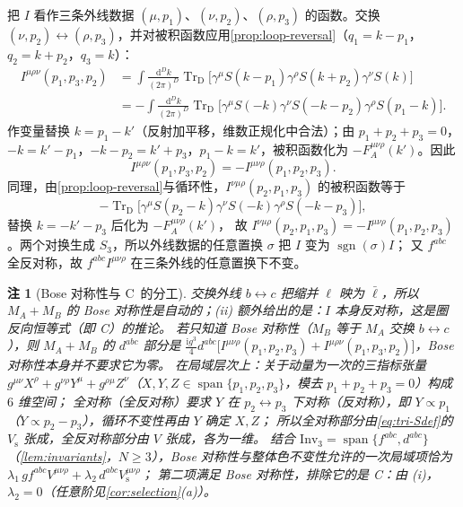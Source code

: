 \documentclass[UTF8,a4paper,11pt,fontset=fandol]{ctexart}
\makeatletter
\theoremstyle{cplain}
\theoremstyle{cdefinition}
\theoremstyle{cremark}
\newtheorem{remark}[theorem]{注}
\renewcommand{\proofname}{证明}
\renewenvironment{proof}[1][\proofname]{\par\pushQED{\qed}\normalfont\topsep6\p@\@plus6\p@\relax
  \trivlist\item[\hskip\labelsep\itshape #1\hspace{0.5em}]\ignorespaces}{\popQED\endtrivlist\@endpefalse}
\numberwithin{equation}{section}
\newcommand{\TrD}{\operatorname{Tr}_{\mathrm{D}}}   %
\newcommand{\dd}{\mathrm{d}}                         %
\newcommand{\ii}{\mathrm{i}}                        %
\makeatother
\begin{document}
\begin{proof}[{\cref{prop:triangle}(ii) 的证明}]
把 $I$ 看作三条外线数据 $(\mu,p_1)$、$(\nu,p_2)$、$(\rho,p_3)$ 的函数。交换 $(\nu,p_2)\leftrightarrow(\rho,p_3)$，并对被积函数应用\cref{prop:loop-reversal}（$q_1=k-p_1$，$q_2=k+p_2$，$q_3=k$）：
\begin{equation*}
\begin{aligned}
I^{\mu\rho\nu}(p_1,p_3,p_2)&=\int\frac{\dd^Dk}{(2\pi)^D}\TrD\bigl[\gamma^\mu S(k-p_1)\gamma^\rho S(k+p_2)\gamma^\nu S(k)\bigr]\\
&=-\int\frac{\dd^Dk}{(2\pi)^D}\TrD\bigl[\gamma^\mu S(-k)\gamma^\nu S(-k-p_2)\gamma^\rho S(p_1-k)\bigr].
\end{aligned}
\end{equation*}
作变量替换 $k=p_1-k'$（反射加平移，维数正规化中合法）；由 $p_1+p_2+p_3=0$，$-k=k'-p_1$，$-k-p_2=k'+p_3$，$p_1-k=k'$，被积函数化为 $-F_A^{\mu\nu\rho}(k')$。因此
\begin{equation}\label{eq:tri-bose23}
I^{\mu\rho\nu}(p_1,p_3,p_2)=-I^{\mu\nu\rho}(p_1,p_2,p_3).
\end{equation}
同理，由\cref{prop:loop-reversal}与循环性，$I^{\nu\mu\rho}(p_2,p_1,p_3)$ 的被积函数等于
\[
-\TrD\bigl[\gamma^\mu S(p_2-k)\gamma^\nu S(-k)\gamma^\rho S(-k-p_3)\bigr],
\]
替换 $k=-k'-p_3$ 后化为 $-F_A^{\mu\nu\rho}(k')$，
故 $I^{\nu\mu\rho}(p_2,p_1,p_3)=-I^{\mu\nu\rho}(p_1,p_2,p_3)$。两个对换生成 $S_3$，所以外线数据的任意置换 $\sigma$ 把 $I$ 变为 $\operatorname{sgn}(\sigma)I$；
又 $f^{abc}$ 全反对称，故 $f^{abc}I^{\mu\nu\rho}$ 在三条外线的任意置换下不变。
\end{proof}

\begin{remark}[Bose 对称性与 C~的分工]\label{rem:tri-bose}
交换外线 $b\leftrightarrow c$ 把缩并 $\ell$ 映为 $\bar\ell$，所以 $M_A+M_B$ 的 Bose 对称性是自动的；(ii) 额外给出的是：$I$ \emph{本身}反对称，这是圈反向恒等式（即 C）的推论。
若只知道 Bose 对称性（$M_B$ 等于 $M_A$ 交换 $b\leftrightarrow c$），则 $M_A+M_B$ 的 $d^{abc}$ 部分是 $\frac{\ii g^3}{4}d^{abc}\bigl[I^{\mu\nu\rho}(p_1,p_2,p_3)+I^{\mu\rho\nu}(p_1,p_3,p_2)\bigr]$，Bose 对称性本身并不要求它为零。
在局域层次上：关于动量为一次的三指标张量 $g^{\mu\nu}X^\rho+g^{\nu\rho}Y^\mu+g^{\rho\mu}Z^\nu$（$X,Y,Z\in\operatorname{span}\{p_1,p_2,p_3\}$，模去 $p_1+p_2+p_3=0$）构成 $6$ 维空间；
全对称（全反对称）要求 $Y$ 在 $p_2\leftrightarrow p_3$ 下对称（反对称），即 $Y\propto p_1$（$Y\propto p_2-p_3$），循环不变性再由 $Y$ 确定 $X,Z$；
所以全对称部分由\cref{eq:tri-Sdef}的 $V_{\mathrm s}$ 张成，全反对称部分由 $V$ 张成，各为一维。
结合 $\mathrm{Inv}_3=\operatorname{span}\{f^{abc},d^{abc}\}$（\cref{lem:invariants}，$N\ge3$），Bose 对称性与整体色不变性允许的一次局域项恰为 $\lambda_1\,g f^{abc}V^{\mu\nu\rho}+\lambda_2\,d^{abc}V_{\mathrm s}^{\mu\nu\rho}$；
第二项满足 Bose 对称性，排除它的是 C：由 (i)，$\lambda_2=0$（任意阶见\cref{cor:selection}(a)）。
\end{remark}
\end{document}
